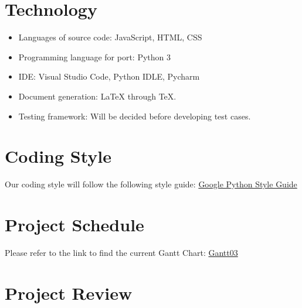 \documentclass{article}
\begin{document}
\section{Technology}
\begin{itemize}
\item Languages of source code: JavaScript, HTML, CSS
\item Programming language for port: Python 3
\item IDE: Visual Studio Code, Python IDLE, Pycharm
\item Document generation: LaTeX through TeX.
\item Testing framework: Will be  decided before developing test cases.

\end{itemize}
\section{Coding Style}
Our coding style will follow the following style guide:\color{blue} 
\href{https://google.github.io/styleguide/pyguide.html}{ Google Python Style Guide} 

\color{black}
\section{Project Schedule}

Please refer to the link to find the current Gantt Chart:
\color{blue}
\href{https://gitlab.cas.mcmaster.ca/liangw15/3XA3Project/blob/master/Doc/DevelopmentPlan/Group12_Gantt03.pdf}{ Gantt03}
\color{black}

\section{Project Review}
\end{document}
